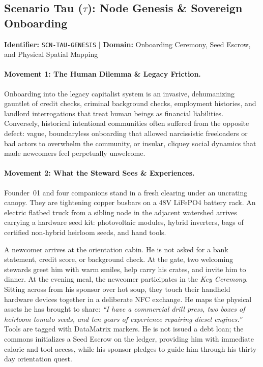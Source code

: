 \subsection{Scenario Tau (\texorpdfstring{$\tau$}{Tau}): Node Genesis \& Sovereign Onboarding}
\label{subsec:scn_tau}
\textbf{Identifier:} \texttt{SCN-TAU-GENESIS} \quad | \quad \textbf{Domain:} Onboarding Ceremony, Seed Escrow, and Physical Spatial Mapping

\paragraph{Movement 1: The Human Dilemma \& Legacy Friction.}
Onboarding into the legacy capitalist system is an invasive, dehumanizing gauntlet of credit checks, criminal background checks, employment histories, and landlord interrogations that treat human beings as financial liabilities. Conversely, historical intentional communities often suffered from the opposite defect: vague, boundaryless onboarding that allowed narcissistic freeloaders or bad actors to overwhelm the community, or insular, cliquey social dynamics that made newcomers feel perpetually unwelcome.

\paragraph{Movement 2: What the Steward Sees \& Experiences.}
Founder~01 and four companions stand in a fresh clearing under an uncrating canopy. They are tightening copper busbars on a 48V LiFePO4 battery rack. An electric flatbed truck from a sibling node in the adjacent watershed arrives carrying a hardware seed kit: photovoltaic modules, hybrid inverters, bags of certified non-hybrid heirloom seeds, and hand tools. 

A newcomer arrives at the orientation cabin. He is not asked for a bank statement, credit score, or background check. At the gate, two welcoming stewards greet him with warm smiles, help carry his crates, and invite him to dinner. At the evening meal, the newcomer participates in the \textit{Key Ceremony}. Sitting across from his sponsor over hot soup, they touch their handheld hardware devices together in a deliberate NFC exchange. He maps the physical assets he has brought to share: \textit{``I have a commercial drill press, two boxes of heirloom tomato seeds, and ten years of experience repairing diesel engines.''} Tools are tagged with DataMatrix markers. He is not issued a debt loan; the commons initializes a Seed Escrow on the ledger, providing him with immediate caloric and tool access, while his sponsor pledges to guide him through his thirty-day orientation quest.

